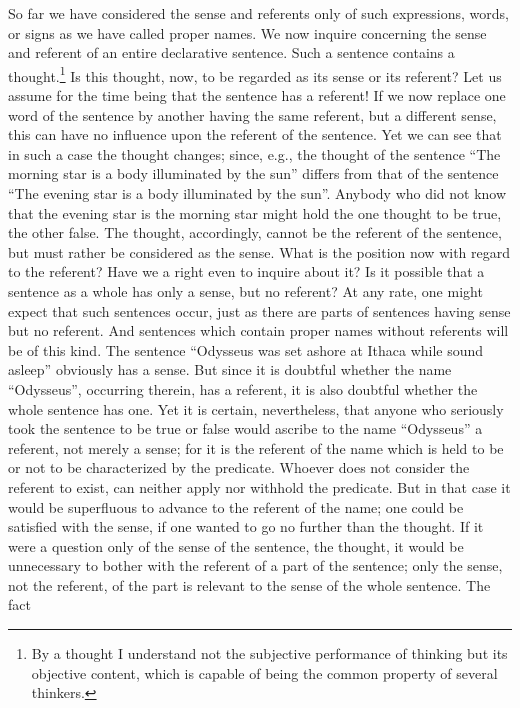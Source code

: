 \documentclass[twoside,12pt]{article}
\begin{document}
So far we have considered the sense and referents only of such
expressions, words, or signs as we have called proper names. We now
inquire concerning the sense and referent of an entire declarative
sentence. Such a sentence contains a thought.\footnote[5]{By a thought
  I understand not the subjective performance of thinking but its
  objective content, which is capable of being the common property of
  several thinkers.} Is this thought, now, to be regarded as its sense
or its referent? Let us assume for the time being that the sentence
has a referent! If we now replace one word of the sentence by another
having the same referent, but a different sense, this can have no
influence upon the referent of the sentence. Yet we can see that in
such a case the thought changes; since, e.g., the thought of the
sentence ``The morning star is a body illuminated by the sun'' differs
from that of the sentence ``The evening star is a body illuminated by
the sun''. Anybody who did not know that the evening star is the
morning star might hold the one thought to be true, the other false.
The thought, accordingly, cannot be the referent of the sentence, but
must rather be considered as the sense. What is the position now with
regard to the referent? Have we a right even to inquire about it? Is
it possible that a sentence as a whole has only a sense, but no
referent? At any rate, one might expect that such sentences occur,
just as there are parts of sentences having sense but no referent. And
sentences which contain proper names without referents will be of this
kind. The sentence ``Odysseus was set ashore at Ithaca while sound
asleep'' obviously has a sense. But since it is doubtful whether the
name ``Odysseus'', occurring therein, has a referent, it is also
doubtful whether the whole sentence has one. Yet it is certain,
nevertheless, that anyone who seriously took the sentence to be true
or false would ascribe to the name ``Odysseus'' a referent, not merely
a sense; for it is the referent of the name which is held to be or not
to be characterized by the predicate. Whoever does not consider the
referent to exist, can neither apply nor withhold the predicate. But
in that case it would be superfluous to advance to the referent of the
name; one could be satisfied with the sense, if one wanted to go no
further than the thought. If it were a question only of the sense of
the sentence, the thought, it would be unnecessary to bother with the
referent of a part of the sentence; only the sense, not the referent,
of the part is relevant to the sense of the whole sentence. The fact
\end{document}
